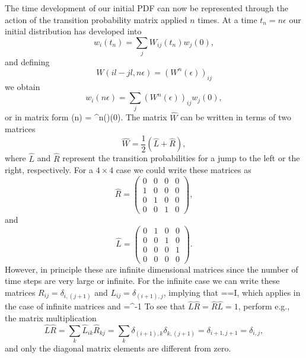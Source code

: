 The time development of our initial PDF can now be represented through the action of
the transition probability matrix applied $n$ times. At a 
time  $t_n=n\epsilon$ our initial distribution has developed into 
\[
   w_i(t_n) = \sum_jW_{ij}(t_n)w_j(0),
\]
and defining 
\[
   W(il-jl,n\epsilon)=(W^n(\epsilon))_{ij}
\]
we obtain 
\[
   w_i(n\epsilon) = \sum_j(W^n(\epsilon))_{ij}w_j(0),
\]
or in matrix form
\be\label{eq:wfinal}
   (n\epsilon) = ^n(\epsilon)(0).
\ee
The matrix $\hat{W}$ can be written in terms of two matrices
\[
    \hat{W} = \frac{1}{2}\left(\hat{L}+\hat{R}\right),
\]
where $\hat{L}$ and $\hat{R}$ represent the transition probabilities for a
jump to the left or the right, respectively.
For a $4\times 4$ case we could write these matrices as
\[ 
   \hat{R} = \left(\begin{array}{cccc} 0 & 0 & 0 & 0\\                   
                                 1 & 0 & 0 & 0\\                   
                                 0 & 1 & 0 & 0\\                   
                                 0 & 0 & 1 & 0\end{array} \right),
\]                   
and 
\[ 
   \hat{L} = \left(\begin{array}{cccc} 0 & 1 & 0 & 0\\                   
                                 0 & 0 & 1 & 0\\                   
                                 0 & 0 & 0 & 1\\                   
                                 0 & 0 & 0 & 0\end{array} \right).
\]                   
However, 
in principle these are infinite dimensional matrices since the number of time
steps are very large or infinite. For the infinite case we can write these
matrices 
$R_{ij} = \delta_{i,(j+1)}$  and $L_{ij} =  \delta_{(i+1),j}$, implying that
\be  \label{eq:rl1}
   ==I,
\ee
which applies in the case of infinite matrices
and 
\be \label{eq:rl2}
    =^{-1}
\ee
To see that $\hat{L}\hat{R}=\hat{R}\hat{L}=1$, perform e.g., the matrix multiplication
\[
    \hat{L}\hat{R}= \sum_{k}\hat{L}_{ik}\hat{R}_{kj}=\sum_k\delta_{(i+1),k}\delta_{k,(j+1)}
     = \delta_{i+1,j+1}=\delta_{i,j},
\]
and only the diagonal matrix elements are different from zero. 


